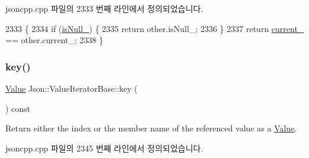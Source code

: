 jsoncpp.\+cpp 파일의 2333 번째 라인에서 정의되었습니다.


\begin{DoxyCode}
2333                                                            \{
2334   \textcolor{keywordflow}{if} (\hyperlink{class_json_1_1_value_iterator_base_a3e08b114a1aed9bde518c527f94a8c59}{isNull\_}) \{
2335     \textcolor{keywordflow}{return} other.isNull\_;
2336   \}
2337   \textcolor{keywordflow}{return} \hyperlink{class_json_1_1_value_iterator_base_ab3138ce8af8301cca3b041ea55cb922a}{current\_} == other.current\_;
2338 \}
\end{DoxyCode}
\mbox{\label{class_json_1_1_value_iterator_base_a3838ba39c43c518cf3ed4aa6ce78ccad}} 
\subsubsection{\texorpdfstring{key()}{key()}}
{\footnotesize\ttfamily \hyperlink{class_json_1_1_value}{Value} Json\+::\+Value\+Iterator\+Base\+::key (\begin{DoxyParamCaption}{ }\end{DoxyParamCaption}) const}

Return either the index or the member name of the referenced value as a \hyperlink{class_json_1_1_value}{Value}. 

jsoncpp.\+cpp 파일의 2345 번째 라인에서 정의되었습니다.



